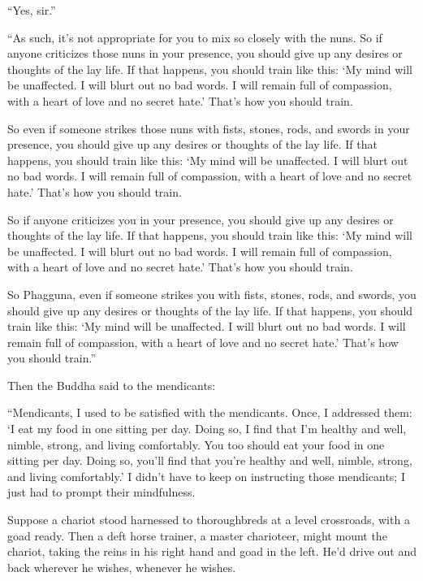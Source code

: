 \documentclass[12pt,openany]{book}%
\begin{document}
“Yes, sir.” 

“As such, it’s not appropriate for you to mix so closely with the nuns. So if anyone criticizes those nuns in your presence, you should give up any desires or thoughts of the lay life. If that happens, you should train like this: ‘My mind will be unaffected. I will blurt out no bad words. I will remain full of compassion, with a heart of love and no secret hate.’ That’s how you should train. 

So even if someone strikes those nuns with fists, stones, rods, and swords in your presence, you should give up any desires or thoughts of the lay life. If that happens, you should train like this: ‘My mind will be unaffected. I will blurt out no bad words. I will remain full of compassion, with a heart of love and no secret hate.’ That’s how you should train. 

So if anyone criticizes you in your presence, you should give up any desires or thoughts of the lay life. If that happens, you should train like this: ‘My mind will be unaffected. I will blurt out no bad words. I will remain full of compassion, with a heart of love and no secret hate.’ That’s how you should train. 

So Phagguna, even if someone strikes you with fists, stones, rods, and swords, you should give up any desires or thoughts of the lay life. If that happens, you should train like this: ‘My mind will be unaffected. I will blurt out no bad words. I will remain full of compassion, with a heart of love and no secret hate.’ That’s how you should train.” 

Then the Buddha said to the mendicants: 

“Mendicants, I used to be satisfied with the mendicants. Once, I addressed them: ‘I eat my food in one sitting per day. Doing so, I find that I’m healthy and well, nimble, strong, and living comfortably. You too should eat your food in one sitting per day. Doing so, you’ll find that you’re healthy and well, nimble, strong, and living comfortably.’ I didn’t have to keep on instructing those mendicants; I just had to prompt their mindfulness. 

Suppose a chariot stood harnessed to thoroughbreds at a level crossroads, with a goad ready. Then a deft horse trainer, a master charioteer, might mount the chariot, taking the reins in his right hand and goad in the left. He’d drive out and back wherever he wishes, whenever he wishes. 
\end{document}
